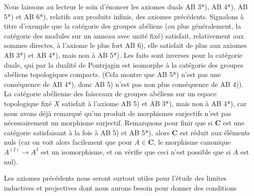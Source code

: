 Nous laissons au lecteur le soin d'énoncer les axiomes duals AB 3*), AB 4*),
AB 5*) et AB 6*), relatifs aux produits infinis, des axiomes précédents.
Signalons à titre d'exemple que la catégorie des groupes abéliens (ou plus
généralement, la catégorie des modules sur un anneau avec unité fixé)
satisfait, relativement aux sommes directes, à l'axiome le plus fort AB 6),
elle satisfait de plus aux axiomes AB 3*) et AB 4*), mais non à AB 5*). Les
faits sont inverses pour la catégorie duale, qui par la dualité de Pontrjagin
est isomorphe à la catégorie des groupes abéliens topologiques compacts. (Cela
montre que AB 5*) n'est pas une conséquence de AB 4*), donc AB 5) n'est pas non
plus conséquence de AB 4)). La catégorie abélienne des faisceaux de groupes
abéliens sur un espace topologique fixé $X$ satisfait à l'axiome AB 5) et
AB 3*), mais non à AB 4*), car nous avons déjà remarqué qu'un produit de
morphismes surjectifs n'est pas nécessairement un morphisme surjectif.
Remarquons pour finir que si $\mathbf{C}$ est une catégorie satisfaisant à la fois à
AB 5) et AB 5*), alors $\mathbf{C}$ est réduit aux éléments nuls (car on voit alors
facilement que pour $A\in\mathbf{C}$, le morphisme canonique
$A^{(I)}\to A^I$ est un isomorphisme, et on vérifie que ceci n'est
possible que si $A$ est nul).

Les axiomes précédents nous seront surtout utiles pour l'étude des limites
inductives et projectives dont nous aurons besoin pour donner des conditions

